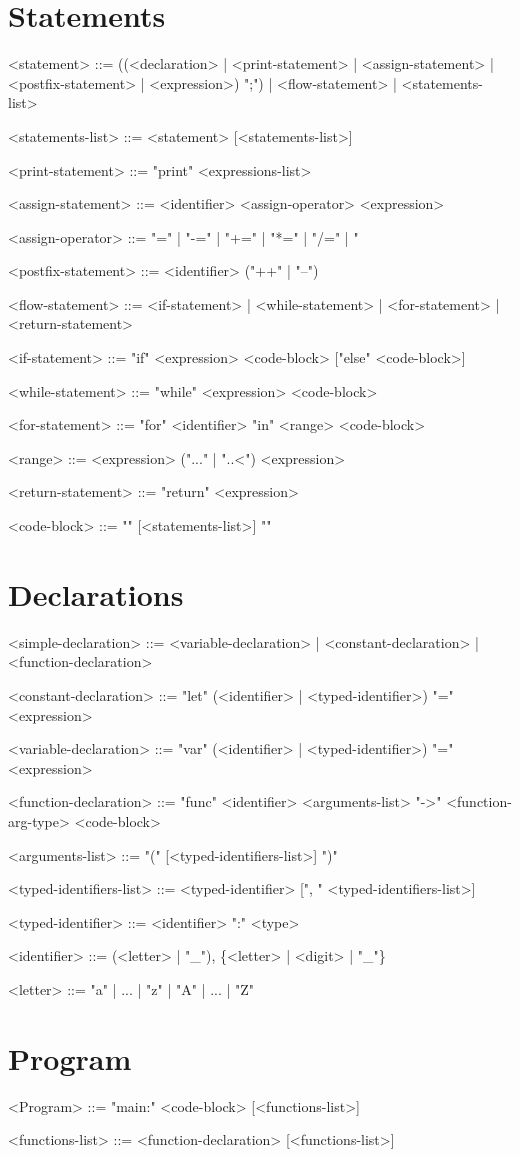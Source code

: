 \documentclass{article}
\begin{document}
\section{Statements}
\begin{grammar}
<statement> ::= ((<declaration> | <print-statement> | <assign-statement> | <postfix-statement> |
<expression>) ";") | <flow-statement> | <statements-list>

<statements-list> ::= <statement> [<statements-list>]

<print-statement> ::= "print" <expressions-list>

<assign-statement> ::= <identifier> <assign-operator> <expression>

<assign-operator> ::= "=" | "-=" | "+=" | "*=" | "/=" | "%

<postfix-statement> ::= <identifier> ("++" | "--")

<flow-statement> ::= <if-statement> | <while-statement> | <for-statement> | <return-statement>

<if-statement> ::= "if" <expression> <code-block> ["else" <code-block>]

<while-statement> ::= "while" <expression> <code-block>

<for-statement> ::= "for" <identifier> "in" <range> <code-block>

<range> ::= <expression> ("..." | "..<") <expression>

<return-statement> ::= "return" <expression>

<code-block> ::= "{" [<statements-list>] "}"
\end{grammar}

\section{Declarations}
\begin{grammar}
<simple-declaration> ::= <variable-declaration> | <constant-declaration> | <function-declaration>

<constant-declaration> ::= "let" (<identifier> | <typed-identifier>) "=" <expression>

<variable-declaration> ::= "var" (<identifier> | <typed-identifier>) "=" <expression>

<function-declaration> ::= "func" <identifier> <arguments-list> "->" <function-arg-type> <code-block>

<arguments-list> ::= "(" [<typed-identifiers-list>] ")"

<typed-identifiers-list> ::= <typed-identifier> [", " <typed-identifiers-list>]

<typed-identifier> ::= <identifier> ":" <type>

<identifier> ::= (<letter> | "_"), \{<letter> | <digit> | "_"\}

<letter> ::= "a" | ... | "z" | "A" | ... | "Z"
\end{grammar}

\section{Program}
\begin{grammar}

<Program> ::= "main:" <code-block> [<functions-list>]

<functions-list> ::= <function-declaration> [<functions-list>]

\end{grammar}
\end{document}
